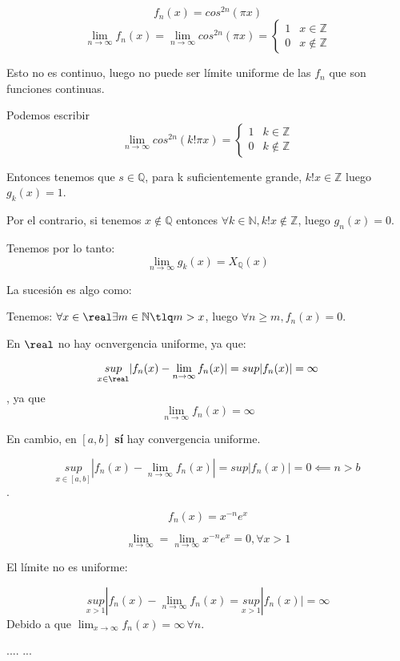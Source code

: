 \documentclass[nochap]{apuntes}
\begin{document}
\begin{problem}[5]
\[f_n(x) = cos^{2n}(\pi x)\]
\solution
\spart
\[\lim_{n\to\infty}f_n(x) = \lim_{n\to\infty}cos^{2n}(\pi x) =\left\{
\begin{array}{cc}
1&x\in\mathbb{Z}\\
0&x\notin\mathbb{Z}
\end{array}\right. \]

Esto no es  continuo, luego no puede ser límite uniforme de las $f_n$ que son funciones continuas.

\spart
Podemos escribir 
\[\lim_{n\to\infty} cos^{2n}(k! \pi x) = \left\{ \begin{array}{cc}1&k\in\mathbb{Z}\\0&k\notin\mathbb{Z}\end{array}\right.\]

Entonces tenemos que $s\in\mathbb{Q}$, para k suficientemente grande, $k!x\in\mathbb{Z}$ luego $g_k(x) = 1$.

Por el contrario, si tenemos $x\notin\mathbb{Q}$ entonces $\forall k\in\mathbb{N}, k!x\notin \mathbb{Z}$, luego $g_n(x) = 0$.

Tenemos por lo tanto: \[\lim_{n\to\infty} g_k(x) = X_{\mathbb{Q}}(x)\]

\spart[d]
La sucesión es algo como:


Tenemos: $\forall x\in\real \exists m\in\mathbb{N} \tlq m>x$, luego $\forall n\ge m, f_n(x) = 0$.

En $\real$ no hay ocnvergencia uniforme, ya que:

\[\underset{x\in\real}{sup }|f_n(x) - \lim_{n\to\infty} f_n(x)| = sup |f_n(x)| = \infty\], ya que 
\[\lim_{n\to\infty}f_n(x) = \infty\]

En cambio, en $[a,b]$ \textbf{sí} hay convergencia uniforme.

\[\underset{x\in[a,b]}{sup }|f_n(x) - \lim_{n\to\infty} f_n(x)| = sup |f_n(x)| = 0 \impliedby n>b \].

\spart[f] \[f_n(x) = x^{-n}e^x\]

\[\lim_{n\to\infty} = \lim_{n\to\infty} x^{-n}e^x = 0, \forall x>1\]

El límite no es uniforme:

\[\underset{x>1}{sup }|f_n(x) - \lim_{n\to\infty}f_n(x) =\underset{x>1}{sup }|f_n(x)| = \infty \]Debido a que $\lim_{x\to\infty}f_n(x) = \infty \,\forall n$.
\end{problem}

\begin{problem}[2]
....
\solution
...

\end{problem}


\newpage
\printindex
\end{document}
